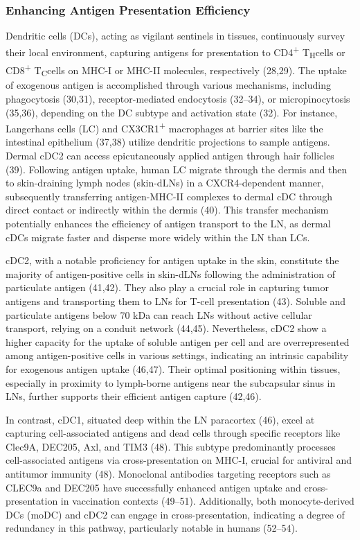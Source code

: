 \documentclass[
]{article}
\begin{document}
\subsubsection{Enhancing Antigen Presentation
Efficiency}\label{enhancing-antigen-presentation-efficiency}

Dendritic cells (DCs), acting as vigilant sentinels in tissues,
continuously survey their local environment, capturing antigens for
presentation to CD4\textsuperscript{+} T\textsubscript{H}cells or
CD8\textsuperscript{+} T\textsubscript{C}cells on MHC-I or MHC-II
molecules, respectively (28,29). The uptake of exogenous antigen is
accomplished through various mechanisms, including phagocytosis (30,31),
receptor-mediated endocytosis (32--34), or micropinocytosis (35,36),
depending on the DC subtype and activation state (32). For instance,
Langerhans cells (LC) and CX3CR1\textsuperscript{+} macrophages at
barrier sites like the intestinal epithelium (37,38) utilize dendritic
projections to sample antigens. Dermal cDC2 can access epicutaneously
applied antigen through hair follicles (39). Following antigen uptake,
human LC migrate through the dermis and then to skin-draining lymph
nodes (skin-dLNs) in a CXCR4-dependent manner, subsequently transferring
antigen-MHC-II complexes to dermal cDC through direct contact or
indirectly within the dermis (40). This transfer mechanism potentially
enhances the efficiency of antigen transport to the LN, as dermal cDCs
migrate faster and disperse more widely within the LN than LCs.

cDC2, with a notable proficiency for antigen uptake in the skin,
constitute the majority of antigen-positive cells in skin-dLNs following
the administration of particulate antigen (41,42). They also play a
crucial role in capturing tumor antigens and transporting them to LNs
for T-cell presentation (43). Soluble and particulate antigens below 70
kDa can reach LNs without active cellular transport, relying on a
conduit network (44,45). Nevertheless, cDC2 show a higher capacity for
the uptake of soluble antigen per cell and are overrepresented among
antigen-positive cells in various settings, indicating an intrinsic
capability for exogenous antigen uptake (46,47). Their optimal
positioning within tissues, especially in proximity to lymph-borne
antigens near the subcapsular sinus in LNs, further supports their
efficient antigen capture (42,46).

In contrast, cDC1, situated deep within the LN paracortex (46), excel at
capturing cell-associated antigens and dead cells through specific
receptors like Clec9A, DEC205, Axl, and TIM3 (48). This subtype
predominantly processes cell-associated antigens via cross-presentation
on MHC-I, crucial for antiviral and antitumor immunity (48). Monoclonal
antibodies targeting receptors such as CLEC9a and DEC205 have
successfully enhanced antigen uptake and cross-presentation in
vaccination contexts (49--51). Additionally, both monocyte-derived DCs
(moDC) and cDC2 can engage in cross-presentation, indicating a degree of
redundancy in this pathway, particularly notable in humans (52--54).
\end{document}
